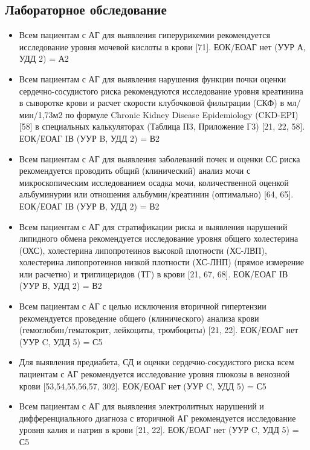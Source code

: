 \documentclass{article}%
\begin{document}
\subsection{Лабораторное обследование}%
\label{subsec:}%
\begin{itemize}%
\item%
Всем пациентам с АГ для выявления гиперурикемии рекомендуется исследование уровня мочевой кислоты в крови {[}71{]}.%
\newline%
ЕОК/ЕОАГ нет (УУР А, УДД 2) = А2%
\item%
Всем пациентам с АГ для выявления нарушения функции почки оценки сердечно{-}сосудистого риска рекомендуются исследование уровня креатинина в сыворотке крови и расчет скорости клубочковой фильтрации (СКФ) в мл/мин/1,73м2 по формуле Chronic Kidney Disease Epidemiology (CKD{-}EPI) {[}58{]} в специальных калькуляторах (Таблица П3, Приложение Г3) {[}21, 22, 58{]}.%
\newline%
ЕОК/ЕОАГ IВ (УУР B, УДД 2) = В2%
\item%
Всем пациентам с АГ для выявления заболеваний почек и оценки СС риска рекомендуется проводить общий (клинический) анализ мочи с микроскопическим исследованием осадка мочи, количественной оценкой альбуминурии или отношения альбумин/креатинин (оптимально) {[}64, 65{]}.%
\newline%
ЕОК/ЕОАГ IВ (УУР В, УДД 2) = В2%
\item%
Всем пациентам с АГ для стратификации риска и выявления нарушений липидного обмена рекомендуется исследование уровня общего холестерина (ОХС), холестерина липопротеинов высокой плотности (ХС{-}ЛВП), холестерина липопротеинов низкой плотности (ХС{-}ЛНП) (прямое измерение или расчетно) и триглицеридов (ТГ) в крови {[}21, 67, 68{]}.%
\newline%
ЕОК/ЕОАГ IВ (УУР В, УДД 2) = В2%
\item%
Всем пациентам с АГ с целью исключения вторичной гипертензии рекомендуется проведение общего (клинического) анализа крови (гемоглобин/гематокрит, лейкоциты, тромбоциты) {[}21, 22{]}.%
\newline%
ЕОК/ЕОАГ нет (УУР C, УДД 5) = С5%
\item%
Для выявления предиабета, СД и оценки сердечно{-}сосудистого риска всем пациентам с АГ рекомендуется исследование уровня глюкозы в венозной крови {[}53,54,55,56,57, 302{]}.%
\newline%
ЕОК/ЕОАГ нет (УУР C, УДД 5) = С5%
\item%
Всем пациентам с АГ для выявления электролитных нарушений и дифференциального диагноза с вторичной АГ рекомендуется исследование уровня калия и натрия в крови {[}21, 22{]}.%
\newline%
ЕОК/ЕОАГ нет (УУР C, УДД 5) = С5%
\end{itemize}
\end{document}
